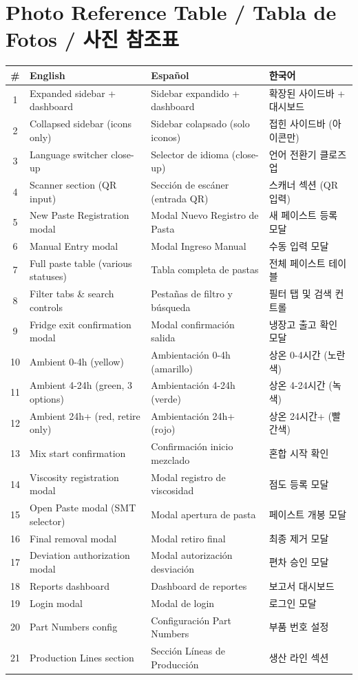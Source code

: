 \documentclass[12pt,a4paper]{article}
\begin{document}
\section*{Photo Reference Table / Tabla de Fotos / 사진 참조표}

\begin{longtable}{clll}
\toprule
\textbf{\#} & \textbf{English} & \textbf{Español} & \textbf{한국어} \\
\midrule
\endhead

1 & Expanded sidebar + dashboard & Sidebar expandido + dashboard & 확장된 사이드바 + 대시보드 \\
2 & Collapsed sidebar (icons only) & Sidebar colapsado (solo iconos) & 접힌 사이드바 (아이콘만) \\
3 & Language switcher close-up & Selector de idioma (close-up) & 언어 전환기 클로즈업 \\
4 & Scanner section (QR input) & Sección de escáner (entrada QR) & 스캐너 섹션 (QR 입력) \\
5 & New Paste Registration modal & Modal Nuevo Registro de Pasta & 새 페이스트 등록 모달 \\
6 & Manual Entry modal & Modal Ingreso Manual & 수동 입력 모달 \\
7 & Full paste table (various statuses) & Tabla completa de pastas & 전체 페이스트 테이블 \\
8 & Filter tabs \& search controls & Pestañas de filtro y búsqueda & 필터 탭 및 검색 컨트롤 \\
9 & Fridge exit confirmation modal & Modal confirmación salida & 냉장고 출고 확인 모달 \\
10 & Ambient 0-4h (yellow) & Ambientación 0-4h (amarillo) & 상온 0-4시간 (노란색) \\
11 & Ambient 4-24h (green, 3 options) & Ambientación 4-24h (verde) & 상온 4-24시간 (녹색) \\
12 & Ambient 24h+ (red, retire only) & Ambientación 24h+ (rojo) & 상온 24시간+ (빨간색) \\
13 & Mix start confirmation & Confirmación inicio mezclado & 혼합 시작 확인 \\
14 & Viscosity registration modal & Modal registro de viscosidad & 점도 등록 모달 \\
15 & Open Paste modal (SMT selector) & Modal apertura de pasta & 페이스트 개봉 모달 \\
16 & Final removal modal & Modal retiro final & 최종 제거 모달 \\
17 & Deviation authorization modal & Modal autorización desviación & 편차 승인 모달 \\
18 & Reports dashboard & Dashboard de reportes & 보고서 대시보드 \\
19 & Login modal & Modal de login & 로그인 모달 \\
20 & Part Numbers config & Configuración Part Numbers & 부품 번호 설정 \\
21 & Production Lines section & Sección Líneas de Producción & 생산 라인 섹션 \\

\bottomrule
\end{longtable}
\end{document}

